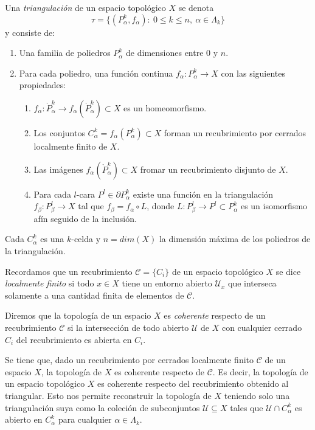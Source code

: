 \begin{definition}
    Una \textit{triangulación} de un espacio topológico $X$ se denota 
    \begin{equation*}
        \tau = \{(P^k_{\alpha}, f_{\alpha}): ~0\le k \le n, ~\alpha\in \Lambda_k\}
    \end{equation*}
    y consiste de:
    \begin{enumerate}
        \item Una familia de poliedros $P^k_{\alpha}$ de dimensiones entre $0$ y $n$.
        \item Para cada poliedro, una función continua $f_{\alpha}:P^k_{\alpha}\to X$ con las siguientes propiedades:
        \begin{enumerate}
            \item $f_{\alpha}: \mathring{P}^k_{\alpha}\to f_{\alpha}(\mathring{P}^k_{\alpha})\subset X$ es un homeomorfismo.
            \item Los conjuntos $C^k_{\alpha}=f_{\alpha}(P^k_{\alpha})\subset X$ forman un recubrimiento por cerrados localmente finito de $X$.
            \item Las imágenes $f_{\alpha}(\mathring{P}^k_{\alpha})\subset X$ fromar un recubrimiento disjunto de $X$.
            \item Para cada $l$-cara $P^l\in \partial P^k_{\alpha}$ existe una función en la triangulación $f_{\beta}:P^l_{\beta}\to X$ tal que $f_{\beta} = f_{\alpha}\circ L$, donde $L: P^l_{\beta}\to P^l\subset P^k_{\alpha}$ es un isomorfismo afín seguido de la inclusión.
        \end{enumerate}
    \end{enumerate}
\end{definition}

\bigskip

Cada $C^k_{\alpha}$ es una $k$-celda y $n=dim(X)$ la dimensión máxima de los poliedros de la triangulación.

Recordamos que un recubrimiento $\mathcal{C}=\{C_i\}$ de un espacio topológico $X$ se dice \textit{localmente finito} si todo $x\in X$ tiene un entorno abierto $\mathcal{U}_x$ que interseca solamente a una cantidad finita de elementos de $\mathcal{C}$. 

Diremos que la topología de un espacio $X$ es \textit{coherente} respecto de un recubrimiento $\mathcal{C}$ si la intersección de todo abierto $\mathcal{U}$ de $X$ con cualquier cerrado $C_i$ del recubrimiento es abierta en $C_i$.

Se tiene que, dado un recubrimiento por cerrados localmente finito $\mathcal{C}$ de un espacio $X$, la topología de $X$ es coherente respecto de $\mathcal{C}$. Es decir, la topología de un espacio topológico $X$ es coherente respecto del recubrimiento obtenido al triangular. Esto nos permite reconstruir la topología de $X$ teniendo solo una triangulación suya como la coleción de subconjuntos $\mathcal{U}\subseteq X$ tales que $\mathcal{U}\cap C^k_{\alpha}$ es abierto en $C^k_{\alpha}$ para cualquier $\alpha\in \Lambda_k$.

